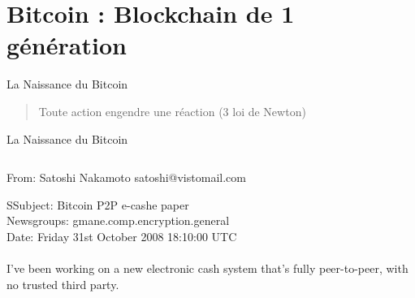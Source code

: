 \documentclass[presentation]{beamer}
\begin{document}
\section{Bitcoin : Blockchain de 1\iere{} génération}
\label{sec:orgeb73947}
\begin{frame}[label={sec:org3b084ec}]{La Naissance du Bitcoin}
\begin{block}{}
\begin{verse}
Toute action engendre une réaction (3\ieme{} loi de Newton)\\[0pt]
\end{verse}
\end{block}
\begin{block}{La Naissance du Bitcoin}
\begin{columns}
\begin{column}{0.70\columnwidth}
\begin{block}{From: Satoshi Nakamoto satoshi@vistomail.com}
\begin{verbatiminput}
SSubject: Bitcoin P2P e-cashe paper\\[0pt]
Newsgroups: gmane.comp.encryption.general\\[0pt]
Date: Friday 31st October 2008 18:10:00 UTC\\[0pt]
~\\[0pt]
I've been working on a new electronic cash system that's fully peer-to-peer, with no trusted third party.
\end{verbatiminput}
\end{block}
\end{column}


\end{columns}
\end{block}
\end{frame}
\end{document}
